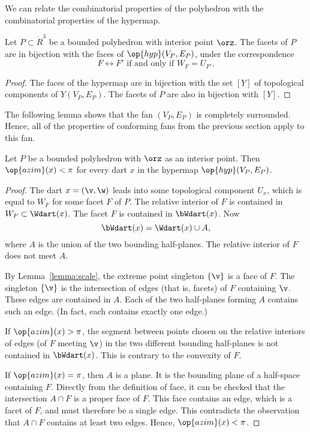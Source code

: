 We can relate the combinatorial properties of the polyhedron with the
combinatorial properties of the hypermap.

\begin{lemma}[]\cutrate{}\label{lemma:facet-bi}
Let $P\subset\ring{R}^3$ be a bounded polyhedron with interior point
$\orz$.  The facets of $P$ are in bijection with the faces of
$\op{hyp}(V_P,E_P)$, under the correspondence
\[ 
F\leftrightarrow F' \text{ if and only if } W_F = U_{F'}.
\] 
\end{lemma}

\begin{proof} The faces of the hypermap are in bijection with the set
$[Y]$ of topological components of $Y(V_P,E_P)$.  The facets of $P$
are also in bijection with $[Y]$.
\end{proof}

The following lemma shows that the fan $(V_P,E_P)$ is completely
surrounded.  Hence, all of the properties of conforming fans from the previous
section apply to this fan.

\begin{lemma}[]\cutrate{} 
Let $P$ be a bounded polyhedron
with $\orz$ as an interior point.  Then $\op{azim}(x) < \pi$ for
every dart $x$ in the hypermap $\op{hyp}(V_P,E_P)$.
\end{lemma}
%
%
%
%

\begin{proof} The dart $x=(\v,\w)$ leads into some topological
component $U_x$, which is equal to $W_F$ for some facet $F$ of $P$.
The relative interior of $F$ is contained in $W_F\subset \Wdart(x)$.
The facet $F$ is contained in $\bWdart(x)$. Now
\[ 
\bWdart(x) = \Wdart(x)\cup A,
\] 
where $A$ is the union of the two bounding half-planes.  The relative
interior of $F$ does not meet $A$.

By Lemma~\ref{lemma:scale}, the extreme point singleton $\{\v\}$ is a face of $F$.  The
singleton $\{\v\}$ is the intersection of edges (that is, facets) of $F$
containing $\v$.  These edges are contained in $A$.  Each of the two
half-planes forming $A$ contains such an edge. (In fact, each contains
exactly one edge.)  %
%
%
%

If $\op{azim}(x)>\pi$, the segment between points chosen on the
relative interiors of edges (of $F$ meeting $\v$) in the two different
bounding half-planes is not contained in $\bWdart(x)$.  This is
contrary to the convexity of $F$.  %
%

If $\op{azim}(x)=\pi$, then $A$ is a plane.  It is the bounding plane
of a half-space containing $F$.  Directly from the definition of face,
it can be checked that the intersection $A\cap F$ is a proper face of
$F$.  This face contains an edge, which is a facet of $F$, and must
therefore be a single edge.  This contradicts the observation that
$A\cap F$ contains at least two edges.  Hence, $\op{azim}(x)<\pi$.
\end{proof}


